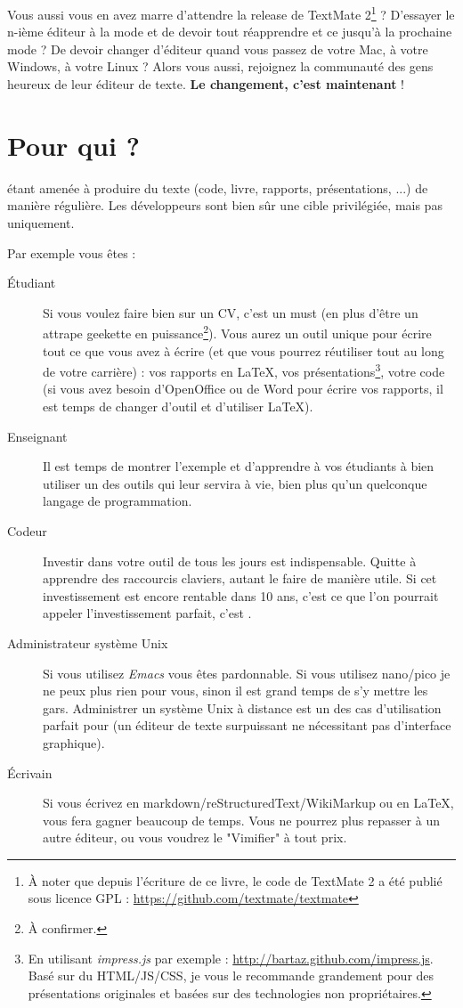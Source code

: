 Vous aussi vous en avez marre d'attendre la release de TextMate 2\footnote{À noter que depuis l'écriture de ce livre, le code de TextMate 2 a été publié sous licence GPL : \url{https://github.com/textmate/textmate}} ? D'essayer le n-ième éditeur à la mode et de devoir tout réapprendre et ce jusqu'à la prochaine mode ? De devoir changer d'éditeur quand vous passez de votre Mac, à votre Windows, à votre Linux ? Alors vous aussi, rejoignez la communauté des gens heureux de leur éditeur de texte. \textbf{Le changement, c'est maintenant} !

\section{Pour qui ?}

 étant amenée à produire du texte (code, livre, rapports, présentations, ...) de manière régulière. Les développeurs sont bien sûr une cible privilégiée, mais pas uniquement.

Par exemple vous êtes :
\begin{description}
    \item[Étudiant] Si vous voulez faire bien sur un CV, c'est un must (en plus d'être un attrape geekette en puissance\footnote{À confirmer.}). Vous aurez un outil unique pour écrire tout ce que vous avez à écrire (et que vous pourrez réutiliser tout au long de votre carrière) : vos rapports en \LaTeX, vos présentations\footnote{En utilisant \emph{impress.js} par exemple : \url{http://bartaz.github.com/impress.js}. Basé sur du HTML/JS/CSS, je vous le recommande grandement pour des présentations originales et basées sur des technologies non propriétaires.}, votre code (si vous avez besoin d'OpenOffice ou de Word pour écrire vos rapports, il est temps de changer d'outil et d'utiliser \LaTeX).
    \item[Enseignant] Il est temps de montrer l'exemple et d'apprendre à vos étudiants à bien utiliser un des outils qui leur servira à vie, bien plus qu'un quelconque langage de programmation.
    \item[Codeur] Investir dans votre outil de tous les jours est indispensable. Quitte à apprendre des raccourcis claviers, autant le faire de manière utile. Si cet investissement est encore rentable dans 10 ans, c'est ce que l'on pourrait appeler l'investissement parfait, c'est \vim.
    \item[Administrateur système Unix] Si vous utilisez \emph{Emacs} vous êtes pardonnable. Si vous utilisez nano/pico je ne peux plus rien pour vous, sinon il est grand temps de s'y mettre les gars. Administrer un système Unix à distance est un des cas d'utilisation parfait pour \vim (un éditeur de texte surpuissant ne nécessitant pas d'interface graphique).
    \item[Écrivain] Si vous écrivez en markdown/reStructuredText/WikiMarkup ou en \LaTeX, \vim vous fera gagner beaucoup de temps. Vous ne pourrez plus repasser à un autre éditeur, ou vous voudrez le "Vimifier" à tout prix.
\end{description}

